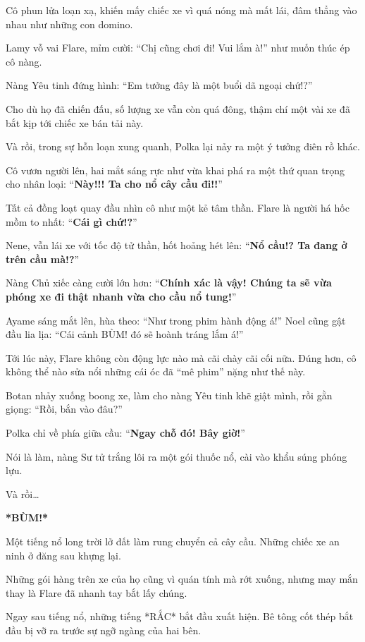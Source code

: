 \documentclass[../main.tex]{subfiles}
\begin{document}
Cô phun lửa loạn xạ, khiến mấy chiếc xe vì quá nóng mà mất lái, đâm thẳng vào nhau như những con domino.

Lamy vỗ vai Flare, mỉm cười: ``Chị cũng chơi đi! Vui lắm à!'' như muốn thúc ép cô nàng.

Nàng Yêu tinh đứng hình: ``Em tưởng đây là một buổi dã ngoại chứ!?''

Cho dù họ đã chiến đấu, số lượng xe vẫn còn quá đông, thậm chí một vài xe đã bắt kịp tới chiếc xe bán tải này.

Và rồi, trong sự hỗn loạn xung quanh, Polka lại nảy ra một ý tưởng điên rồ khác.

Cô vươn người lên, hai mắt sáng rực như vừa khai phá ra một thứ quan trọng cho nhân loại: ``\textbf{Này!!! Ta cho nổ cây cầu đi!!}''

Tất cả đồng loạt quay đầu nhìn cô như một kẻ tâm thần. Flare là người há hốc mồm to nhất: ``\textbf{Cái gì chứ!?}''

Nene, vẫn lái xe với tốc độ tử thần, hốt hoảng hét lên: ``\textbf{Nổ cầu!? Ta đang ở trên cầu mà!?}''

Nàng Chủ xiếc càng cười lớn hơn: ``\textbf{Chính xác là vậy! Chúng ta sẽ vừa phóng xe đi thật nhanh vừa cho cầu nổ tung!}''

Ayame sáng mắt lên, hùa theo: ``Như trong phim hành động á!'' Noel cũng gật đầu lia lịa: ``Cái cảnh BÙM! đó sẽ hoành tráng lắm á!''

Tới lúc này, Flare không còn động lực nào mà cãi chày cãi cối nữa. Đúng hơn, cô không thể nào sửa nổi những cái óc đã ``mê phim'' nặng như thế này.

Botan nhảy xuống boong xe, làm cho nàng Yêu tinh khẽ giật mình, rồi gằn giọng: ``Rồi, bắn vào đâu?''

Polka chỉ về phía giữa cầu: ``\textbf{Ngay chỗ đó! Bây giờ!}''

Nói là làm, nàng Sư tử trắng lôi ra một gói thuốc nổ, cài vào khẩu súng phóng lựu.

Và rồi\dots

\textbf{*BÙM!*}

Một tiếng nổ long trời lở đất làm rung chuyển cả cây cầu. Những chiếc xe an ninh ở đăng sau khựng lại.

Những gói hàng trên xe của họ cũng vì quán tính mà rớt xuống, nhưng may mắn thay là Flare đã nhanh tay bắt lấy chúng.

Ngay sau tiếng nổ, những tiếng *RẮC* bắt đầu xuất hiện. Bê tông cốt thép bắt đầu bị vỡ ra trước sự ngỡ ngàng của hai bên.
\end{document}
